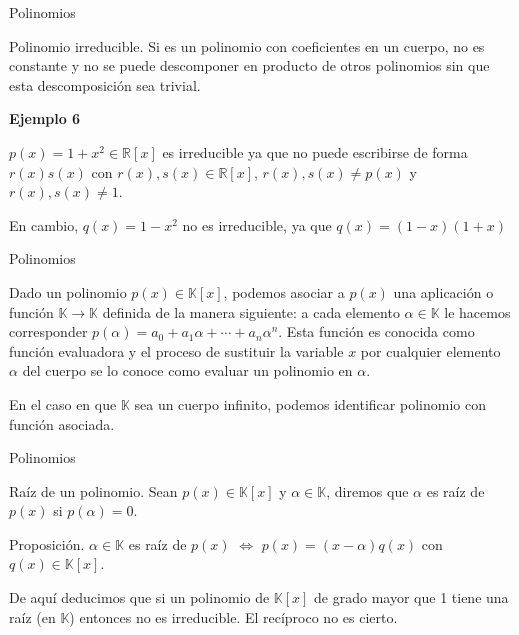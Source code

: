 \documentclass[
  ignorenonframetext,
]{beamer}
\begin{document}
\begin{frame}{Polinomios}
\protect\hypertarget{polinomios-6}{}

Polinomio irreducible. Si es un polinomio con coeficientes en un cuerpo,
no es constante y no se puede descomponer en producto de otros
polinomios sin que esta descomposición sea trivial.

\textbf{Ejemplo 6}

\(p(x) = 1+x^2\in\mathbb{R}[x]\) es irreducible ya que no puede
escribirse de forma \(r(x)s(x)\) con \(r(x),s(x)\in\mathbb{R}[x]\),
\(r(x),s(x)\ne p(x)\) y \(r(x),s(x)\ne 1\).

En cambio, \(q(x)=1-x^2\) no es irreducible, ya que \(q(x)=(1-x)(1+x)\)

\end{frame}

\begin{frame}{Polinomios}
\protect\hypertarget{polinomios-7}{}

Dado un polinomio \(p(x)\in\mathbb{K}[x]\), podemos asociar a \(p(x)\)
una aplicación o función \(\mathbb{K}\longrightarrow\mathbb{K}\)
definida de la manera siguiente: a cada elemento \(\alpha\in\mathbb{K}\)
le hacemos corresponder \(p(\alpha)=a_0+a_1\alpha+\cdots+a_n\alpha^n\).
Esta función es conocida como función evaluadora y el proceso de
sustituir la variable \(x\) por cualquier elemento \(\alpha\) del cuerpo
se lo conoce como evaluar un polinomio en \(\alpha\).

En el caso en que \(\mathbb{K}\) sea un cuerpo infinito, podemos
identificar polinomio con función asociada.

\end{frame}

\begin{frame}{Polinomios}
\protect\hypertarget{polinomios-8}{}

Raíz de un polinomio. Sean \(p(x)\in\mathbb{K}[x]\) y
\(\alpha\in\mathbb{K}\), diremos que \(\alpha\) es raíz de \(p(x)\) si
\(p(\alpha)=0\).

Proposición. \(\alpha\in\mathbb{K}\) es raíz de \(p(x)\)
\(\Leftrightarrow\) \(p(x)=(x-\alpha)q(x)\) con
\(q(x)\in\mathbb{K}[x]\).

De aquí deducimos que si un polinomio de \(\mathbb{K}[x]\) de grado
mayor que 1 tiene una raíz (en \(\mathbb{K}\)) entonces no es
irreducible. El recíproco no es cierto.

\end{frame}
\end{document}
